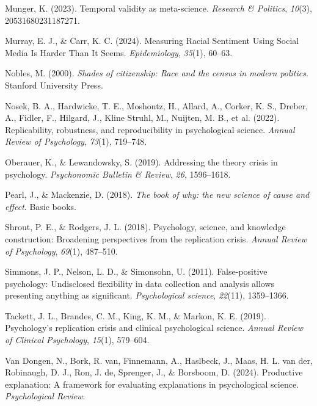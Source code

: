\documentclass[
  letterpaper,
]{krantz}
\newlength{\cslhangindent}
\newenvironment{CSLReferences}[2] %
 {\begin{list}{}{%
  \setlength{\itemindent}{0pt}
  \setlength{\leftmargin}{0pt}
  \setlength{\parsep}{0pt}
  \ifodd #1
   \setlength{\leftmargin}{\cslhangindent}
   \setlength{\itemindent}{-1\cslhangindent}
  \fi
  \setlength{\itemsep}{#2\baselineskip}}}
 {\end{list}}
\begin{document}
\begin{CSLReferences}{1}{0}
Munger, K. (2023). Temporal validity as meta-science. \emph{Research \&
Politics}, \emph{10}(3), 20531680231187271.

Murray, E. J., \& Carr, K. C. (2024). Measuring Racial Sentiment Using
Social Media Is Harder Than It Seems. \emph{Epidemiology}, \emph{35}(1),
60--63.

Nobles, M. (2000). \emph{Shades of citizenship: Race and the census in
modern politics}. Stanford University Press.

Nosek, B. A., Hardwicke, T. E., Moshontz, H., Allard, A., Corker, K. S.,
Dreber, A., Fidler, F., Hilgard, J., Kline Struhl, M., Nuijten, M. B.,
et al. (2022). Replicability, robustness, and reproducibility in
psychological science. \emph{Annual Review of Psychology}, \emph{73}(1),
719--748.

Oberauer, K., \& Lewandowsky, S. (2019). Addressing the theory crisis in
psychology. \emph{Psychonomic Bulletin \& Review}, \emph{26},
1596--1618.

Pearl, J., \& Mackenzie, D. (2018). \emph{The book of why: the new
science of cause and effect}. Basic books.

Shrout, P. E., \& Rodgers, J. L. (2018). Psychology, science, and
knowledge construction: Broadening perspectives from the replication
crisis. \emph{Annual Review of Psychology}, \emph{69}(1), 487--510.

Simmons, J. P., Nelson, L. D., \& Simonsohn, U. (2011). False-positive
psychology: Undisclosed flexibility in data collection and analysis
allows presenting anything as significant. \emph{Psychological science},
\emph{22}(11), 1359--1366.

Tackett, J. L., Brandes, C. M., King, K. M., \& Markon, K. E. (2019).
Psychology's replication crisis and clinical psychological science.
\emph{Annual Review of Clinical Psychology}, \emph{15}(1), 579--604.

Van Dongen, N., Bork, R. van, Finnemann, A., Haslbeck, J., Maas, H. L.
van der, Robinaugh, D. J., Ron, J. de, Sprenger, J., \& Borsboom, D.
(2024). Productive explanation: A framework for evaluating explanations
in psychological science. \emph{Psychological Review}.


\end{CSLReferences}
\end{document}
